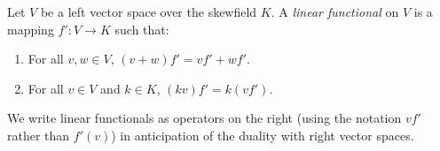 Let $V$ be a left vector space over the skewfield $K$. A \textit{linear functional} on $V$ is a mapping $f': V \to K$ such that:

\begin{enumerate}
\item[(i)] For all $v, w \in V$, $(v + w)f' = vf' + wf'$.
\item[(ii)] For all $v \in V$ and $k \in K$, $(kv)f' = k(vf')$.
\end{enumerate}

We write linear functionals as operators on the right (using the notation $vf'$ rather than $f'(v)$) in anticipation of the duality with right vector spaces.
